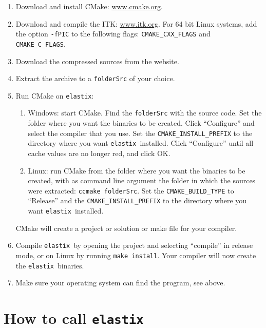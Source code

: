 \documentclass[]{report}
\newcommand{\elastix}{\texttt{elastix}}
\begin{document}
\begin{enumerate}
\item Download and install CMake: \url{www.cmake.org}.

\item Download and compile the ITK: \url{www.itk.org}. For 64 bit
Linux systems, add the option \texttt{-fPIC} to the following flags:
\texttt{CMAKE\_CXX\_FLAGS} and \texttt{CMAKE\_C\_FLAGS}.

\item Download the compressed sources from the website.

\item Extract the archive to a \texttt{folderSrc} of your choice.

\item Run CMake on \elastix:
    \begin{enumerate}
    \item Windows: start CMake. Find the \texttt{folderSrc} with the
    source code. Set the folder where you want the binaries to be
    created. Click ``Configure'' and select the compiler that you
    use. Set the \texttt{CMAKE\_INSTALL\_PREFIX} to the directory
    where you want \elastix\ installed. Click ``Configure'' until
    all cache values are no longer red, and click OK.

    \item Linux: run CMake from the folder where you want the
    binaries to be created, with as command line argument the folder
    in which the sources were extracted: \texttt{ccmake folderSrc}.
    Set the \texttt{CMAKE\_BUILD\_TYPE} to ``Release'' and the
    \texttt{CMAKE\_INSTALL\_PREFIX} to the directory where you want
    \elastix\ installed.
    \end{enumerate}
CMake will create a project or solution or make file for your
compiler.

\item Compile \elastix\ by opening the project and selecting
``compile'' in release mode, or on Linux by running \texttt{make
install}. Your compiler will now create the \elastix\ binaries.

\item Make sure your operating system can find the program, see
above.
\end{enumerate}

\section{How to call \elastix}\label{sec:elastix:call}
\end{document}
